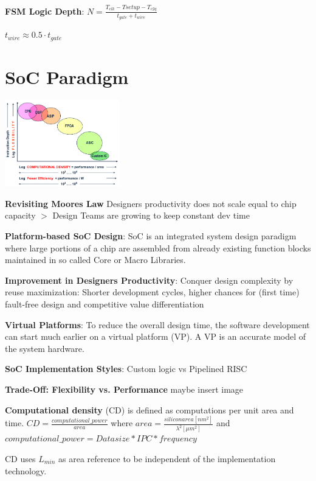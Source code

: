 \documentclass[english]{latex4ei/latex4ei_sheet}
\begin{document}
\textbf{FSM Logic Depth}: $N = \frac{T_{clk} - T{setup} - T_{c2q}}{t_{gate} + t_{wire}}$

$t_{wire} \approx 0.5 \cdot t_{gate}$



\section{SoC Paradigm}

\begin{center}
	\includegraphics[width = 5cm]{images/3.SoCParadigm/Paradigm.png}
\end{center}

\textbf{Revisiting Moores Law} Designers productivity does not scale equal to chip capacity $>$ Design Teams are growing to keep constant dev time

\textbf{Platform-based SoC Design}: SoC is an integrated system design paradigm where large portions of a chip are assembled from already existing function blocks maintained in so called Core or Macro Libraries.

\textbf{Improvement in Designers Productivity}: Conquer design complexity by reuse maximization: Shorter development cycles, higher chances for (first time) fault-free design and competitive value differentiation

\textbf{Virtual Platforms}: To reduce the overall design time, the software development can start much earlier on a virtual platform (VP). A VP is an accurate model of the system hardware.

\textbf{SoC Implementation Styles}: Custom logic vs Pipelined RISC

\textbf{Trade-Off: Flexibility vs. Performance} maybe insert image

\textbf{Computational density} (CD) is defined as computations per unit area and time.
$CD = \frac{computational\_power}{area}$ where $area = \frac{siliconarea [nm^2]}{\lambda^2 [\mu m^2]}$ and $computational\_power = Data size * IPC * frequency$

CD uses $L_{min}$ as area reference to be independent of the implementation technology.
\end{document}
